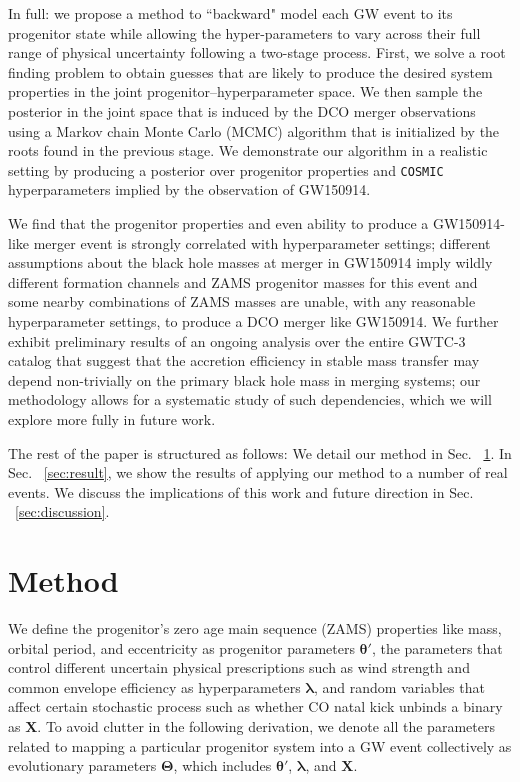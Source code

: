 \documentclass[twocolumn]{aastex631}
\begin{document}
In full: we propose a method to ``backward" model each GW event to its
progenitor state while allowing the hyper-parameters to vary across their full
range of physical uncertainty following a two-stage process. First, we solve a
root finding problem to obtain guesses that are likely to produce the desired
system properties in the joint progenitor--hyperparameter space. We then sample
the posterior in the joint space that is induced by the DCO merger observations
using a Markov chain Monte Carlo (MCMC) algorithm that is initialized by the
roots found in the previous stage.  We demonstrate our algorithm in a realistic
setting by producing a posterior over progenitor properties and \texttt{COSMIC}
hyperparameters implied by the observation of GW150914.  

We find that the progenitor properties and even ability to produce a
GW150914-like merger event is strongly correlated with hyperparameter settings;
different assumptions about the black hole masses at merger in GW150914 imply
wildly different formation channels and ZAMS progenitor masses for this event
and some nearby combinations of ZAMS masses are unable, with any reasonable
hyperparameter settings, to produce a DCO merger like GW150914.  We further
exhibit preliminary results of an ongoing analysis over the entire GWTC-3
catalog \citep{GWTC-3} that suggest that the accretion efficiency in stable mass
transfer may depend non-trivially on the primary black hole mass in merging
systems; our methodology allows for a systematic study of such dependencies,
which we will explore more fully in future work.

The rest of the paper is structured as
follows: We detail our method in Sec. ~\ref{sec:method}. In Sec.
~\ref{sec:result}, we show the results of applying our method to a number of
real events. We discuss the implications of this work and future direction in
Sec. ~\ref{sec:discussion}.

\section{Method}
\label{sec:method}


We define the progenitor's zero age main sequence (ZAMS) properties like
mass, orbital period, and eccentricity as progenitor parameters $\bm{\theta'}$, the parameters
that control different uncertain physical prescriptions such as wind strength and common
envelope efficiency as hyperparameters $\bm{\lambda}$, and random variables
that affect certain stochastic process such as whether CO natal kick unbinds a
binary as $\bm{X}$. To avoid clutter in the following derivation, we denote all
the parameters related to mapping a particular progenitor system into a GW event
collectively as evolutionary parameters $\bm{\Theta}$, which includes
$\bm{\theta'}$, $\bm{\lambda}$, and $\bm{X}$.
\end{document}
